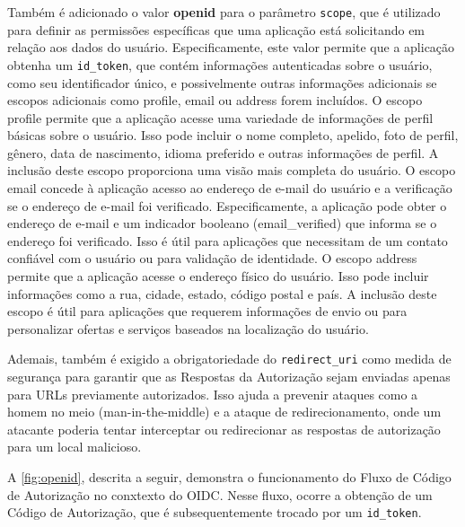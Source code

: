 Também é adicionado o valor \textbf{openid} para o parâmetro \texttt{scope}, que é utilizado para definir as permissões específicas que uma aplicação está solicitando em relação aos dados do usuário. Especificamente, este valor permite que a aplicação obtenha um \texttt{id\_token}, que contém informações autenticadas sobre o usuário, como seu identificador único, e possivelmente outras informações adicionais se escopos adicionais como profile, email ou address forem incluídos. O escopo profile permite que a aplicação acesse uma variedade de informações de perfil básicas sobre o usuário. Isso pode incluir o nome completo, apelido, foto de perfil, gênero, data de nascimento, idioma preferido e outras informações de perfil. A inclusão deste escopo proporciona uma visão mais completa do usuário. O escopo email concede à aplicação acesso ao endereço de e-mail do usuário e a verificação se o endereço de e-mail foi verificado. Especificamente, a aplicação pode obter o endereço de e-mail e um indicador booleano (email\_verified) que informa se o endereço foi verificado. Isso é útil para aplicações que necessitam de um contato confiável com o usuário ou para validação de identidade. O escopo address permite que a aplicação acesse o endereço físico do usuário. Isso pode incluir informações como a rua, cidade, estado, código postal e país. A inclusão deste escopo é útil para aplicações que requerem informações de envio ou para personalizar ofertas e serviços baseados na localização do usuário.

Ademais, também é exigido a obrigatoriedade do \texttt{redirect\_uri} como medida de segurança para garantir que as Respostas da Autorização sejam enviadas apenas para URLs previamente autorizados. Isso ajuda a prevenir ataques como a homem no meio (man-in-the-middle) e a ataque de redirecionamento, onde um atacante poderia tentar interceptar ou redirecionar as respostas de autorização para um local malicioso. 


A \autoref{fig:openid}, descrita a seguir, demonstra o funcionamento do Fluxo de Código de Autorização no conxtexto do \acs{OIDC}. Nesse fluxo, ocorre a obtenção de um Código de Autorização, que é subsequentemente trocado por um \texttt{id\_token}.



